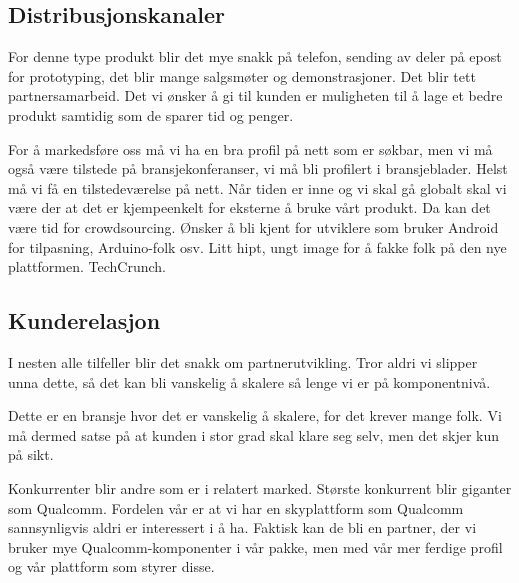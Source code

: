 


\subsection{Distribusjonskanaler}

For denne type produkt blir det mye snakk på telefon, sending av deler på epost
for prototyping, det blir mange salgsmøter og demonstrasjoner. Det blir tett
partnersamarbeid. Det vi ønsker å gi til kunden er muligheten til å lage et
bedre produkt samtidig som de sparer tid og penger.

For å markedsføre oss må vi ha en bra profil på nett som er søkbar, men vi må
også være tilstede på bransjekonferanser, vi må bli profilert i bransjeblader.
Helst må vi få en tilstedeværelse på nett. Når tiden er inne og vi skal gå
globalt skal vi være der at det er kjempeenkelt for eksterne å bruke vårt
produkt. Da kan det være tid for crowdsourcing. Ønsker å bli kjent for
utviklere som bruker Android for tilpasning, Arduino-folk osv. Litt hipt, ungt
image for å fakke folk på den nye plattformen. TechCrunch.

\subsection{Kunderelasjon}

I nesten alle tilfeller blir det snakk om partnerutvikling. Tror aldri vi
slipper unna dette, så det kan bli vanskelig å skalere så lenge vi er på
komponentnivå.

Dette er en bransje hvor det er vanskelig å skalere, for det krever mange folk.
Vi må dermed satse på at kunden i stor grad skal klare seg selv, men det skjer
kun på sikt.

Konkurrenter blir andre som er i relatert marked. Største konkurrent blir
giganter som Qualcomm. Fordelen vår er at vi har en skyplattform som Qualcomm
sannsynligvis aldri er interessert i å ha. Faktisk kan de bli en partner, der
vi bruker mye Qualcomm-komponenter i vår pakke, men med vår mer ferdige profil
og vår plattform som styrer disse.

